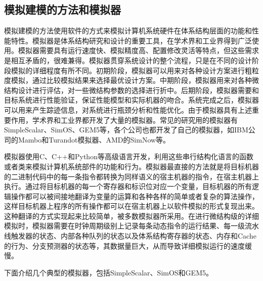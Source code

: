 \documentclass[]{ctexbook}
\begin{document}
\hypertarget{ux6a21ux62dfux5efaux6a21ux7684ux65b9ux6cd5ux548cux6a21ux62dfux5668}{%
\subsection{模拟建模的方法和模拟器}\label{ux6a21ux62dfux5efaux6a21ux7684ux65b9ux6cd5ux548cux6a21ux62dfux5668}}

模拟建模的方法使用软件的方式来模拟计算机系统硬件在体系结构层面的功能和性能特性。模拟器是体系结构研究和设计的重要工具，在学术界和工业界得到广泛使用。模拟器需要具有运行速度快、模拟精度高、配置修改灵活等特点，但这些需求是相互矛盾的，很难兼得。模拟器贯穿系统设计的整个流程，只是在不同的设计阶段模拟的详细程度有所不同。初期阶段，模拟器可以用来对各种设计方案进行粗粒度模拟，通过比较模拟结果来选择最优设计方案。中期阶段，模拟器用来对各种微结构设计进行评估，对一些微结构参数的选择进行折中。后期阶段，模拟器需要和目标系统进行性能验证，保证性能模型和实际机器的吻合。系统完成之后，模拟器可以用来产生踪迹信息，对系统进行瓶颈分析和性能优化。由于模拟器具有上述重要作用，学术界和工业界都开发了大量的模拟器。常见的研究用的模拟器有SimpleScalar、SimOS、GEM5等，各个公司也都开发了自己的模拟器，如IBM公司的Mambo和Turandot模拟器、AMD的SimNow等。

模拟器使用C、C++和Python等高级语言开发，利用这些串行结构化语言的函数或者类来模拟计算机系统部件的功能和行为。模拟器最直接的方法就是将目标机器的二进制代码中的每一条指令都转换为同样语义的宿主机器的指令，在宿主机器上执行。通过将目标机器的每一个寄存器和标识位对应一个变量，目标机器的所有逻辑操作都可以被间接地翻译为变量的运算和各种各样的简单或者复杂的算法操作，这样目标机器上程序的所有操作都可以在宿主机器上以软件模拟的形式复现出来。这种翻译的方式实现起来比较简单，被多数模拟器所采用。在进行微结构级的详细模拟时，模拟器需要在时钟周期级别上记录每条动态指令的运行结果、每一级流水线触发器的状态、内部各种队列的状态以及体系结构寄存器的状态、内存和Cache的行为、分支预测器的状态等，其数据量巨大，从而导致详细模拟运行的速度缓慢。

下面介绍几个典型的模拟器，包括SimpleScalar、SimOS和GEM5。
\end{document}
